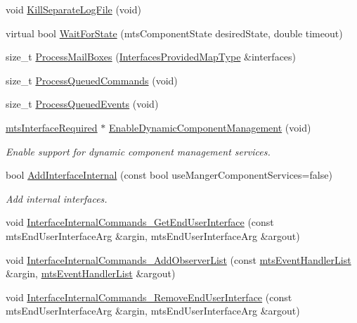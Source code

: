 \begin{DoxyCompactItemize}
void \hyperlink{classmts_component_a88650abb8ed5890c29dc43668f1bccf4}{Kill\+Separate\+Log\+File} (void)
\item 
virtual bool \hyperlink{classmts_component_a936b8338f2c699abbf40faeaed3dff6e}{Wait\+For\+State} (mts\+Component\+State desired\+State, double timeout)
\item 
size\+\_\+t \hyperlink{classmts_component_a1012e9c56f4ad1e3e4ff50cf91597f63}{Process\+Mail\+Boxes} (\hyperlink{classmts_component_a1d4117bf122737abe5f943a7ce057ff6}{Interfaces\+Provided\+Map\+Type} \&interfaces)
\item 
size\+\_\+t \hyperlink{classmts_component_a63f22cf3b9b991e8d4762ea563396174}{Process\+Queued\+Commands} (void)
\item 
size\+\_\+t \hyperlink{classmts_component_a9d424fa33b3234ff3d2672b62e9f1675}{Process\+Queued\+Events} (void)
\item 
\hyperlink{classmts_interface_required}{mts\+Interface\+Required} $\ast$ \hyperlink{classmts_component_aa63a28894e3fd44a231924a24d40428a}{Enable\+Dynamic\+Component\+Management} (void)
\begin{DoxyCompactList}\small\item\em Enable support for dynamic component management services. \end{DoxyCompactList}\item 
bool \hyperlink{classmts_component_af24429ddbfe7177fcfaf35482254f917}{Add\+Interface\+Internal} (const bool use\+Manger\+Component\+Services=false)
\begin{DoxyCompactList}\small\item\em Add internal interfaces. \end{DoxyCompactList}\item 
void \hyperlink{classmts_component_a4b1bf49f0edcbbe123e40399f971e494}{Interface\+Internal\+Commands\+\_\+\+Get\+End\+User\+Interface} (const mts\+End\+User\+Interface\+Arg \&argin, mts\+End\+User\+Interface\+Arg \&argout)
\item 
void \hyperlink{classmts_component_ad9814156d7cd119f30b49671e38bbaf3}{Interface\+Internal\+Commands\+\_\+\+Add\+Observer\+List} (const \hyperlink{classmts_event_handler_list}{mts\+Event\+Handler\+List} \&argin, \hyperlink{classmts_event_handler_list}{mts\+Event\+Handler\+List} \&argout)
\item 
void \hyperlink{classmts_component_ab9c1d9ee9ee050e75b11b839f8516e1c}{Interface\+Internal\+Commands\+\_\+\+Remove\+End\+User\+Interface} (const mts\+End\+User\+Interface\+Arg \&argin, mts\+End\+User\+Interface\+Arg \&argout)

\end{DoxyCompactItemize}
